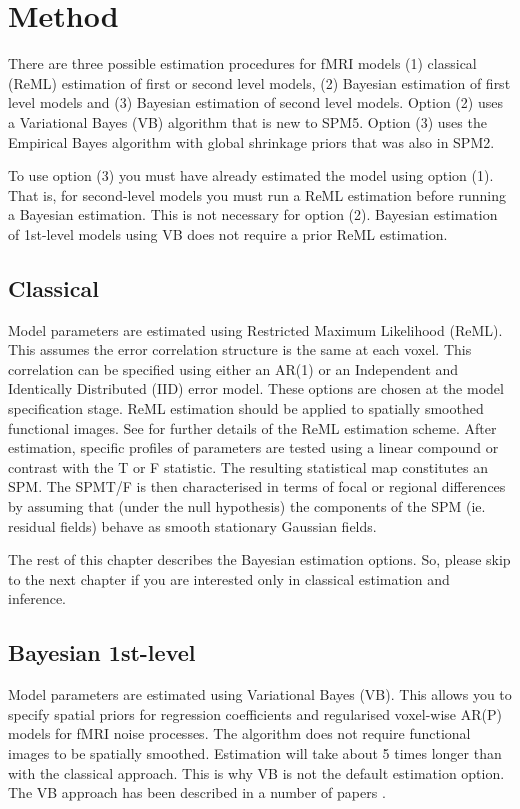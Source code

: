 \section{Method}

There are three possible estimation procedures for fMRI models (1) classical (ReML) estimation of first or second level models, (2) Bayesian estimation of first level models and (3) Bayesian estimation of second level models. Option (2) uses a Variational Bayes (VB) algorithm that is new to SPM5. Option (3) uses the Empirical Bayes algorithm with global shrinkage priors that was also in SPM2. 

To use option (3) you must have already estimated the model using option (1). That is, for second-level models you must run a ReML estimation before running a Bayesian estimation. This is not necessary for option (2). Bayesian estimation of 1st-level models using VB does not require a prior ReML estimation.

\subsection{Classical}

Model parameters are estimated using Restricted Maximum Likelihood (ReML). This assumes the error correlation structure is the same at each voxel. This correlation can be specified using either an AR(1) or an Independent and Identically Distributed (IID) error model. These options are chosen at the model specification stage. ReML estimation should be applied to spatially smoothed functional images. See \cite{peb1,peb2} for further details of the ReML estimation scheme. After estimation, specific profiles of parameters are tested using a linear compound or contrast with the T or F statistic. The resulting statistical map constitutes an SPM. The SPM{T}/{F} is then characterised in terms of focal or regional differences by assuming that (under the null hypothesis) the components of the SPM (ie. residual fields) behave as smooth stationary Gaussian fields.

The rest of this chapter describes the Bayesian estimation options. So, please skip to the next chapter if you are interested only in classical estimation and inference. 

\subsection{Bayesian 1st-level}

Model parameters are estimated using Variational Bayes (VB). This allows you to specify spatial priors for regression coefficients and regularised voxel-wise AR(P) models for fMRI noise processes. The algorithm does not require functional images to be spatially smoothed. Estimation will take about 5 times longer than with the classical approach. This is why VB is not the default estimation option. The VB approach has been described in a number of papers \cite{vb_fmri_ar,vb2,vb3,will_bayes_srglm}.
                                                          
